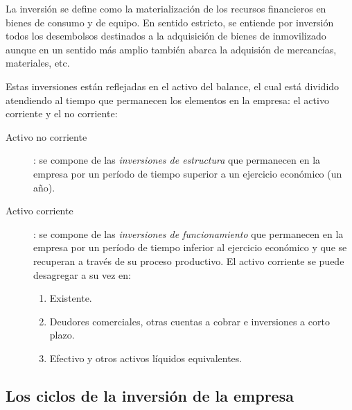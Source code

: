 \documentclass[10pt,a4paper,spanish]{report}
\begin{document}
        La inversión se define como la materialización de los recursos financieros en bienes de consumo y de equipo. En sentido estricto, se entiende por inversión todos los desembolsos destinados a la adquisición de bienes de inmovilizado aunque en un sentido más amplio también abarca la adquisión de mercancías, materiales, etc.

        Estas inversiones están reflejadas en el activo del balance, el cual está dividido atendiendo al tiempo que permanecen los elementos en la empresa: el activo corriente y el no corriente:
        \begin{description}
            \item[Activo no corriente]: se compone de las \textit{\textcolor[rgb]{0.4,0.7,0.4}{inversiones de estructura}} que permanecen en la empresa por un período de tiempo superior a un ejercicio económico (un año).
            \item[Activo corriente]: se compone de las \textit{\textcolor[rgb]{0.4,0.7,0.4}{inversiones de funcionamiento}} que permanecen en la empresa por un período de tiempo inferior al ejercicio económico y que se recuperan a través de su proceso productivo. El activo corriente se puede desagregar a su vez en:
            \begin{enumerate}
                \item Existente.
                \item Deudores comerciales, otras cuentas a cobrar e inversiones a corto plazo.
                \item Efectivo y otros activos líquidos equivalentes.
            \end{enumerate}
        \end{description}

      \subsection{\textcolor[rgb]{0.4,0.7,0.4}Los ciclos de la inversión de la empresa}
\end{document}
